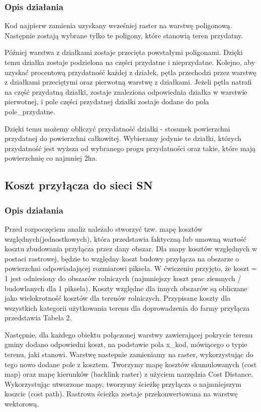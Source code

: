 \documentclass{article}
\begin{document}
\subsubsection{Opis działania}
Kod najpierw zamienia uzyskany wcześniej raster na warstwę poligonową. Następnie zostają wybrane tylko te poligony, które stanowią teren przydatny.

Później warstwa z działkami zostaje przecięta powstałymi poligonami. Dzięki temu działka zostaje podzielona na części przydatne i nieprzydatne. Kolejno, aby uzyskać procentową przydatność każdej z działek, pętla przechodzi przez warstwę z działkami przeciętymi oraz pierwotną warstwę z działkami. 
Jeżeli pętla natrafi na część przydatną działki, zostaje znaleziona odpowiednia działka w warstwie pierwotnej, i pole części przydatnej działki zostaje dodane do pola pole\_przydatne.

Dzięki temu możemy obliczyć przydatność działki - stosunek powierzchni przydatnej do powierzchni całkowitej. Wybieramy jedynie te działki, których przydatność jest wyższa od wybranego progu przydatności oraz takie, które mają powierzchnię co najmniej 2ha.

\subsection{Koszt przyłącza do sieci SN}
\subsubsection{Opis działania}
Przed rozpoczęciem analiz należało stworzyć tzw. mapę kosztów względnych(jednostkowych), która przedstawia faktyczną lub umowną wartość kosztu zbudowania
przyłącza przez dany obszar. Dla mapy kosztów względnych w postaci rastrowej, będzie to względny koszt budowy przyłącza na obszarze o powierzchni odpowiadającej rozmiarowi
piksela. W ćwiczeniu przyjęto, że koszt = 1 jest odniesiony do obszarów rolniczych (najmniejszy koszt prac ziemnych / budowlanych dla 1 piksela). Koszty względne dla innych obszarów są obliczane jako wielokrotność kosztów dla terenów rolniczych. Przypisane koszty dla wszystkich kategorii użytkowania terenu dla doprowadzenia do
farmy przyłącza przedstawia Tabela 2.

Następnie, dla każdego obiektu połączonej warstwy zawierającej pokrycie terenu gminy dodano odpowiedni koszt, na podstawie pola x\_kod, mówiącego o typie terenu, jaki stanowi. Warstwę nastepnie zamieniamy na raster, wykorzystując do tego nowo dodane pole z kosztem. Tworzymy mapę kosztów skumulowanych (cost map) oraz mapę kierunków (backlink raster) z użyciem narzędzia Cost Distance. Wykorzystując utworzone mapy, tworzymy ścieżkę przyłącza o najmniejszym koszcie (cost path). Rastrowa ścieżka zostaje przekonwertowana na warstwę wektorową.
\end{document}
